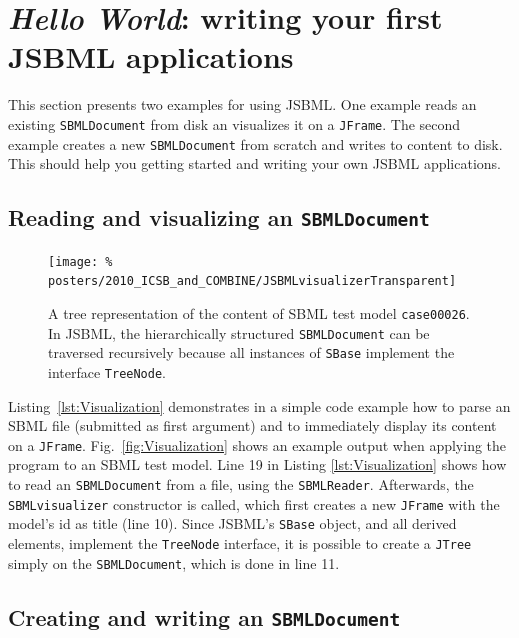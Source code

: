 \section{\emph{Hello World}: writing your first JSBML applications}

This section presents two examples for using JSBML. One example reads an
existing \texttt{SBMLDocument} from disk an visualizes it on a \texttt{JFrame}.
The second example creates a new \texttt{SBMLDocument} from scratch and writes
to content to disk. This should help you getting started and writing your own
JSBML applications.

\subsection{Reading and visualizing an \texttt{SBMLDocument}}



\begin{figure}
\texttt{[image: \%
posters/2010\_ICSB\_and\_COMBINE/JSBMLvisualizerTransparent]}
\caption[Tree representation of an SBML file]{A tree representation of the
content of SBML test model \texttt{case00026}. In JSBML, the hierarchically
structured \texttt{SBMLDocument} can be traversed recursively because all
instances of \texttt{SBase} implement the interface \texttt{TreeNode}.}
\label{fig:Visualization}
\end{figure}

Listing~\vref{lst:Visualization} demonstrates in a simple code example how to
parse an SBML file (submitted as first argument) and to
immediately display its content on a \texttt{JFrame}.
%
Fig.~\vref{fig:Visualization} shows an example output when applying the program
to an SBML test model.
Line 19 in Listing \ref{lst:Visualization} shows how to read an
\texttt{SBMLDocument} from a file, using the \texttt{SBMLReader}. Afterwards, the
\texttt{SBMLvisualizer} constructor is called, which first creates a new
\texttt{JFrame} with the model's id as title (line 10). Since JSBML's
\texttt{SBase} object, and all derived elements, implement the \texttt{TreeNode}
interface, it is possible to create a \texttt{JTree} simply on the
\texttt{SBMLDocument}, which is done in line 11.

\subsection{Creating and writing an \texttt{SBMLDocument}}

